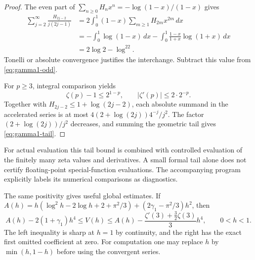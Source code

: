 \begin{proof}
The even part of $\sum_{n\geq0}H_nx^n=-\log(1-x)/(1-x)$ gives
\begin{align*}
 \sum_{j=2}^{\infty}\frac{H_{2j-2}}{j(2j-1)}
 &=2\int_0^1(1-x)\sum_{m\geq1}H_{2m}x^{2m}\,dx\\
 &=-\int_0^1\log(1-x)\,dx
     -\int_0^1\frac{1-x}{1+x}\log(1+x)\,dx\\
 &=2\log2-\log^22.
\end{align*}
Tonelli or absolute convergence justifies the interchange. Subtract
this value from \eqref{eq:gamma1-odd}.

For $p\geq3$, integral comparison yields
\[
 \zeta(p)-1\leq2^{1-p},\qquad
 |\zeta'(p)|\leq2\cdot2^{-p}.
\]
Together with $H_{2j-2}\leq1+\log(2j-2)$, each absolute summand
in the accelerated series is at most
$4(2+\log(2j))4^{-j}/j^2$. The factor
$(2+\log(2j))/j^2$ decreases, and summing the geometric tail gives
\eqref{eq:gamma1-tail}.
\end{proof}

For actual evaluation this tail bound is combined with controlled
evaluation of the finitely many zeta values and derivatives. A small
formal tail alone does not certify floating-point special-function
evaluations. The accompanying program explicitly labels its numerical
comparisons as diagnostics.

The same positivity gives useful global estimates. If
$A(h)=h(\log^2h-2\log h+2+\pi^2/3)
 +(2\gamma_1-\pi^2/3)h^2$, then
\begin{equation}\label{eq:V-bounds}
 A(h)-2(1+\gamma_1)h^4
 \leq V(h)\leq
 A(h)-\frac{\zeta'(3)+\tfrac32\zeta(3)}{3}h^4,
 \qquad 0<h<1.
\end{equation}
The left inequality is sharp at $h=1$ by continuity, and the right
has the exact first omitted coefficient at zero. For computation one
may replace $h$ by $\min(h,1-h)$ before using the convergent series.
